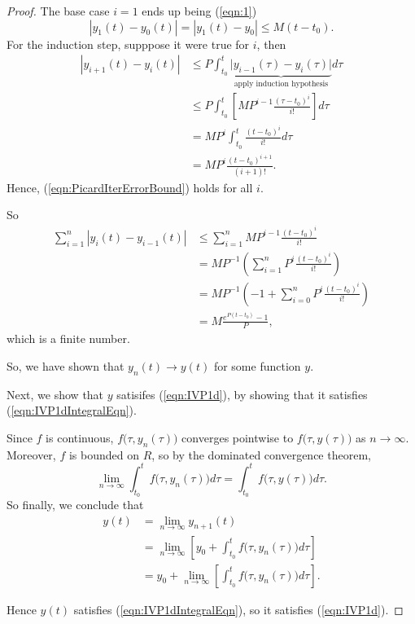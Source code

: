 \documentclass{article}
\begin{document}
\begin{proof}
The base case $i=1$ ends up being (\ref{eqn:1}) 
\[
    |y_1(t) - y_0(t)|
    =
    |y_1(t) - y_0| 
    \leq
    M(t-t_0).
\]
For the induction step, supppose it were true for $i$, then
\begin{align*}
    |y_{i+1}(t)-y_i(t)|
    &\leq
    P
    \int_{t_0}^t
    \underbrace{
        \big\lvert
            y_{i-1}(\tau) - y_i(\tau)
        \big\rvert
    }_{\text{apply induction hypothesis}}
    d\tau \\
    &\leq
    P
    \int_{t_0}^t
    \left[
        MP^{i-1}\frac{(\tau-t_0)^i}{i!}
    \right]
    d\tau
    \\
    &=
    MP^i
    \int_{t_0}^t
    \frac{(t-t_0)^i}{i!}
    d\tau \\
    &=
    MP^i\frac{(t-t_0)^{i+1}}{(i+1)!}.
\end{align*}
Hence, (\ref{eqn:PicardIterErrorBound}) holds for all $i$.

So
\begin{align*}
    \sum_{i=1}^n 
    |y_i(t) - y_{i-1}(t)|
    &\leq
    \sum_{i=1}^n
    MP^{i-1}\frac{(t-t_0)^i}{i!} \\
    &=
    MP^{-1}\left(
        \sum_{i=1}^n
        P^i\frac{(t-t_0)^i}{i!} 
    \right) \\
    &=
    MP^{-1}\left(
        -1 + \sum_{i=0}^n
        P^i\frac{(t-t_0)^i}{i!} 
    \right) \\
    &=
    M\frac{e^{P(t-t_0)}-1}{P},
\end{align*}
which is a finite number.

So, we have shown that $y_n(t) \to y(t)$ for some function $y$.

Next, we show that $y$ satisifes (\ref{eqn:IVP1d}), by showing that it satisfies (\ref{eqn:IVP1dIntegralEqn}).

Since $f$ is continuous,  $f\big(\tau, y_n(\tau)\big)$ converges pointwise to $f\big(\tau, y(\tau)\big)$ as $n \to \infty$. 
Moreover, $f$ is bounded on $R$, so by the dominated convergence theorem,
\[
    \lim_{n\to\infty}\int_{t_0}^t f\big(\tau,y_n(\tau)\big)d\tau
    = 
    \int_{t_0}^t f\big(\tau,y(\tau)\big)d\tau.
\]
So finally, we conclude that
\begin{align*}
    y(t)
    &=
    \lim_{n\to\infty}
    y_{n+1}(t) \\
    &=
    \lim_{n\to\infty}
    \left[
        y_0 + \int_{t_0}^t
        f\big(\tau, y_n(\tau)\big)
        d\tau
    \right] \\
    &=
    y_0 + \lim_{n\to\infty}
    \left[
        \int_{t_0}^t
        f\big(\tau, y_n(\tau)\big)
        d\tau
    \right].
\end{align*}

Hence $y(t)$ satisfies (\ref{eqn:IVP1dIntegralEqn}), so it satisfies (\ref{eqn:IVP1d}).

\end{proof}
\end{document}
